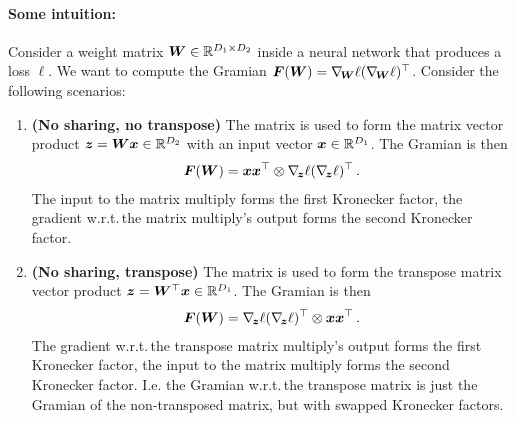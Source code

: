 \documentclass{article}
\begin{document}
\paragraph{Some intuition:} Consider a weight matrix ${\bm{W}} \in {\mathbb{R}}^{D_1 \times
  D_2}$ inside a neural network that produces a loss $\ell$. We want to compute
the Gramian ${\bm{F}}({\bm{W}}) = \nabla_{\!{{\bm{W}}}}\ell (\nabla_{\!{{\bm{W}}}}\ell)^{\top}$. Consider the following scenarios:
\begin{enumerate}
\item \textbf{(No sharing, no transpose)} The matrix is used to form the matrix vector product ${\bm{z}} = {\bm{W}} {\bm{x}} \in {\mathbb{R}}^{D_2}$ with an input vector ${\bm{x}} \in {\mathbb{R}}^{D_1}$.
  The Gramian is then
  \begin{align*}
    {\bm{F}}({\bm{W}}) = {\bm{x}} {\bm{x}}^{\top} \otimes \nabla_{\!{{\bm{z}}}}\ell (\nabla_{\!{{\bm{z}}}}\ell)^{\top}\,.
  \end{align*}
  The input to the matrix multiply forms the first Kronecker factor, the gradient w.r.t.\,the matrix multiply's output forms the second Kronecker factor.

\item \textbf{(No sharing, transpose)} The matrix is used to form the transpose matrix vector product ${\bm{z}} = {\bm{W}}^{\top} {\bm{x}} \in {\mathbb{R}}^{D_1}$.
  The Gramian is then
  \begin{align*}
    {\bm{F}}({\bm{W}}) = \nabla_{\!{{\bm{z}}}}\ell (\nabla_{\!{{\bm{z}}}}\ell)^{\top} \otimes {\bm{x}} {\bm{x}}^{\top}\,.
  \end{align*}
  The gradient w.r.t.\,the transpose matrix multiply's output forms the first Kronecker factor, the input to the matrix multiply forms the second Kronecker factor.
  I.e.
  the Gramian w.r.t.\,the transpose matrix is just the Gramian of the non-transposed matrix, but with swapped Kronecker factors.


\end{enumerate}
\end{document}
